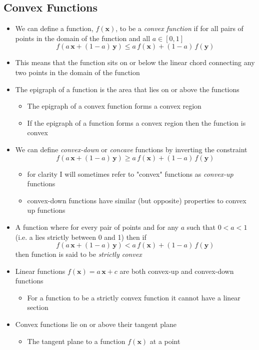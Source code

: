 \documentclass[11pt]{article}
\begin{document}
\subsection{Convex Functions}
\label{sec:org2782deb}
\begin{itemize}
\item We can define a function, \(f(\bm{x})\), to be a \emph{convex function}
if for all pairs of points in the domain of the function and all
\(a\in[0,1]\) $$ f(a \,\bm{x} + (1-a)\, \bm{y}) \leq a \,
     f(\bm{x}) + (1-a) \, f(\bm{y}) $$
\item This means that the function sits on or below the linear chord
connecting any two points in the domain of the function
\item The epigraph of a function is the area that lies on or above the
functions
\begin{itemize}
\item The epigraph of a convex function forms a convex region
\item If the epigraph of a function forms a convex region then the
function is convex
\end{itemize}
\item We can define \emph{convex-down} or \emph{concave} functions by inverting the constraint
$$  f(a \,\bm{x} + (1-a)\, \bm{y}) \geq  a \, f(\bm{x}) + (1-a) \, f(\bm{y}) $$
\begin{itemize}
\item for clarity I will sometimes refer to "convex" functions as
\emph{convex-up} functions
\item convex-down functions have similar (but opposite) properties to
convex up functions
\end{itemize}
\item A function where for every pair of points and for any \(a\) such
that \(0<a<1\) (i.e. a lies strictly between 0 and 1) then if
$$  f(a \,\bm{x} + (1-a)\, \bm{y}) < a \, f(\bm{x}) + (1-a) \, f(\bm{y}) $$
then function is said to be \emph{strictly convex}
\item Linear functions \(f(\bm{x}) = a\,\bm{x} +c\) are both convex-up
and convex-down functions
\begin{itemize}
\item For a function to be a strictly convex function it cannot have
a linear section
\end{itemize}
\item Convex functions lie on or above their tangent plane
\begin{itemize}
\item The tangent plane to a function \(f(\bm{x})\) at a point

\end{itemize}
\end{itemize}
\end{document}
